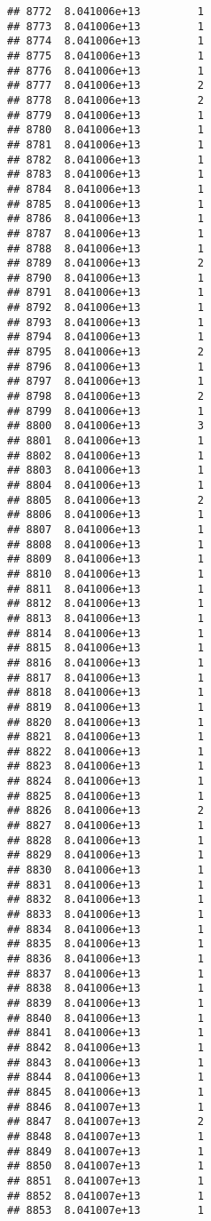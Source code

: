 \documentclass[
]{article}
\begin{document}
\begin{verbatim}
## 8772  8.041006e+13         1
## 8773  8.041006e+13         1
## 8774  8.041006e+13         1
## 8775  8.041006e+13         1
## 8776  8.041006e+13         1
## 8777  8.041006e+13         2
## 8778  8.041006e+13         2
## 8779  8.041006e+13         1
## 8780  8.041006e+13         1
## 8781  8.041006e+13         1
## 8782  8.041006e+13         1
## 8783  8.041006e+13         1
## 8784  8.041006e+13         1
## 8785  8.041006e+13         1
## 8786  8.041006e+13         1
## 8787  8.041006e+13         1
## 8788  8.041006e+13         1
## 8789  8.041006e+13         2
## 8790  8.041006e+13         1
## 8791  8.041006e+13         1
## 8792  8.041006e+13         1
## 8793  8.041006e+13         1
## 8794  8.041006e+13         1
## 8795  8.041006e+13         2
## 8796  8.041006e+13         1
## 8797  8.041006e+13         1
## 8798  8.041006e+13         2
## 8799  8.041006e+13         1
## 8800  8.041006e+13         3
## 8801  8.041006e+13         1
## 8802  8.041006e+13         1
## 8803  8.041006e+13         1
## 8804  8.041006e+13         1
## 8805  8.041006e+13         2
## 8806  8.041006e+13         1
## 8807  8.041006e+13         1
## 8808  8.041006e+13         1
## 8809  8.041006e+13         1
## 8810  8.041006e+13         1
## 8811  8.041006e+13         1
## 8812  8.041006e+13         1
## 8813  8.041006e+13         1
## 8814  8.041006e+13         1
## 8815  8.041006e+13         1
## 8816  8.041006e+13         1
## 8817  8.041006e+13         1
## 8818  8.041006e+13         1
## 8819  8.041006e+13         1
## 8820  8.041006e+13         1
## 8821  8.041006e+13         1
## 8822  8.041006e+13         1
## 8823  8.041006e+13         1
## 8824  8.041006e+13         1
## 8825  8.041006e+13         1
## 8826  8.041006e+13         2
## 8827  8.041006e+13         1
## 8828  8.041006e+13         1
## 8829  8.041006e+13         1
## 8830  8.041006e+13         1
## 8831  8.041006e+13         1
## 8832  8.041006e+13         1
## 8833  8.041006e+13         1
## 8834  8.041006e+13         1
## 8835  8.041006e+13         1
## 8836  8.041006e+13         1
## 8837  8.041006e+13         1
## 8838  8.041006e+13         1
## 8839  8.041006e+13         1
## 8840  8.041006e+13         1
## 8841  8.041006e+13         1
## 8842  8.041006e+13         1
## 8843  8.041006e+13         1
## 8844  8.041006e+13         1
## 8845  8.041006e+13         1
## 8846  8.041007e+13         1
## 8847  8.041007e+13         2
## 8848  8.041007e+13         1
## 8849  8.041007e+13         1
## 8850  8.041007e+13         1
## 8851  8.041007e+13         1
## 8852  8.041007e+13         1
## 8853  8.041007e+13         1

\end{verbatim}
\end{document}
